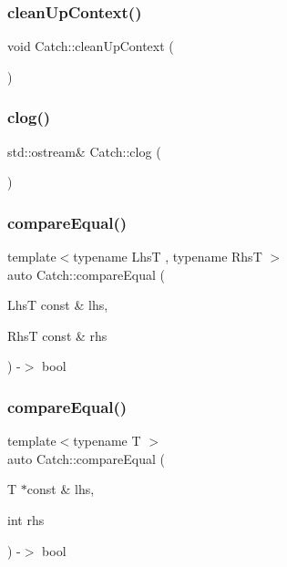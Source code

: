 \mbox{\label{namespace_catch_ae50508f10ffc4ed873a31a4db4caea16}} 
\subsubsection{\texorpdfstring{cleanUpContext()}{cleanUpContext()}}
{\footnotesize\ttfamily void Catch\+::clean\+Up\+Context (\begin{DoxyParamCaption}{ }\end{DoxyParamCaption})}

\mbox{\label{namespace_catch_a5a0677089050dcdb4848f56fb47e9279}} 
\subsubsection{\texorpdfstring{clog()}{clog()}}
{\footnotesize\ttfamily std\+::ostream\& Catch\+::clog (\begin{DoxyParamCaption}{ }\end{DoxyParamCaption})}

\mbox{\label{namespace_catch_af89b8df30cfaf09abd048c6ff67359ee}} 
\subsubsection{\texorpdfstring{compareEqual()}{compareEqual()}\hspace{0.1cm}{\footnotesize\ttfamily [1/5]}}
{\footnotesize\ttfamily template$<$typename LhsT , typename RhsT $>$ \\
auto Catch\+::compare\+Equal (\begin{DoxyParamCaption}\item[{LhsT const \&}]{lhs,  }\item[{RhsT const \&}]{rhs }\end{DoxyParamCaption}) -\/$>$ bool }

\mbox{\label{namespace_catch_a68f451c45e65f242dde5f21c19a4cf7a}} 
\subsubsection{\texorpdfstring{compareEqual()}{compareEqual()}\hspace{0.1cm}{\footnotesize\ttfamily [2/5]}}
{\footnotesize\ttfamily template$<$typename T $>$ \\
auto Catch\+::compare\+Equal (\begin{DoxyParamCaption}\item[{T $\ast$const \&}]{lhs,  }\item[{int}]{rhs }\end{DoxyParamCaption}) -\/$>$ bool }

